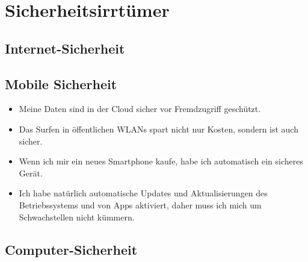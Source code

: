 \section{Sicherheitsirrtümer}

\subsection{Internet-Sicherheit}



\subsection{Mobile Sicherheit}

\begin{frame}
\begin{itemize}
	\item Meine Daten sind in der Cloud sicher vor Fremdzugriff geschützt.
	\item Das Surfen in öffentlichen WLANs spart nicht nur Kosten, sondern ist auch sicher.
	\item Wenn ich mir ein neues Smartphone kaufe, habe ich automatisch ein sicheres Gerät.
	\item Ich habe natürlich automatische Updates und Aktualisierungen des Betriebssystems und von Apps aktiviert, daher muss ich mich um Schwachstellen nicht kümmern.
\end{itemize}
\end{frame}

\subsection{Computer-Sicherheit}



